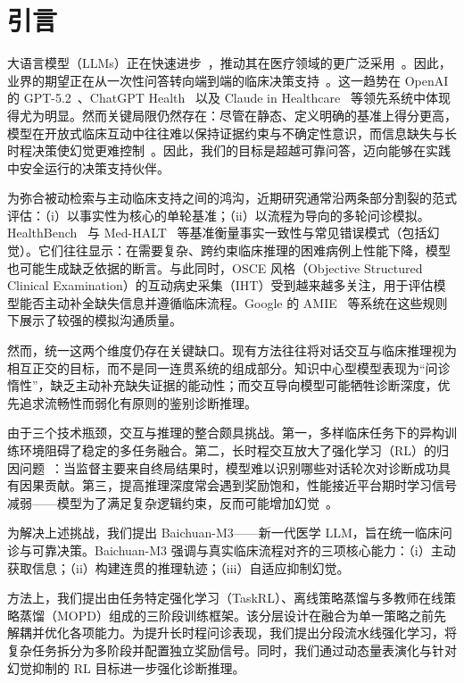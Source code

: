 \section{引言}
大语言模型（LLMs）正在快速进步~\cite{gpt4, o1, bc2,omni15}，推动其在医疗领域的更广泛采用~\cite{bcm1,baichuan-m2,MedGemma,Lingshu,Hulu-Med}。因此，业界的期望正在从一次性问答转向端到端的临床决策支持~\cite{MedDM,ArgMed}。这一趋势在 OpenAI 的 GPT-5.2~\cite{openai2025gpt52}、ChatGPT Health~\cite{chatgpt_health} 以及 Claude in Healthcare~\cite{anthropic_healthcare} 等领先系统中体现得尤为明显。然而关键局限仍然存在：尽管在静态、定义明确的基准上得分更高，模型在开放式临床互动中往往难以保持证据约束与不确定性意识，而信息缺失与长时程决策使幻觉更难控制~\cite{hallubug}。因此，我们的目标是超越可靠问答，迈向能够在实践中安全运行的决策支持伙伴。

为弥合被动检索与主动临床支持之间的鸿沟，近期研究通常沿两条部分割裂的范式评估：（i）以事实性为核心的单轮基准；（ii）以流程为导向的多轮问诊模拟。HealthBench~\cite{healthbench} 与 Med-HALT~\cite{ankit2023medhalt} 等基准衡量事实一致性与常见错误模式（包括幻觉）。它们往往显示：在需要复杂、跨约束临床推理的困难病例上性能下降，模型也可能生成缺乏依据的断言。与此同时，OSCE 风格（Objective Structured Clinical Examination）的互动病史采集（IHT）受到越来越多关注，用于评估模型能否主动补全缺失信息并遵循临床流程。Google 的 AMIE~\cite{tao2024amie, elahe2025amie} 等系统在这些规则下展示了较强的模拟沟通质量。

然而，统一这两个维度仍存在关键缺口。现有方法往往将对话交互与临床推理视为相互正交的目标，而不是同一连贯系统的组成部分。知识中心型模型表现为“问诊惰性”，缺乏主动补充缺失证据的能动性；而交互导向模型可能牺牲诊断深度，优先追求流畅性而弱化有原则的鉴别诊断推理。

由于三个技术瓶颈，交互与推理的整合颇具挑战。第一，多样临床任务下的异构训练环境阻碍了稳定的多任务融合。第二，长时程交互放大了强化学习（RL）的归因问题~\cite{guo2025deepseek,bcalign,DBLP:conf/cacre/CaoZ19}：当监督主要来自终局结果时，模型难以识别哪些对话轮次对诊断成功具有因果贡献。第三，提高推理深度常会遇到奖励饱和，性能接近平台期时学习信号减弱——模型为了满足复杂逻辑约束，反而可能增加幻觉~\cite{DBLP:journals/corr/abs-2505-23646,DBLP:journals/corr/abs-2510-22977}。

为解决上述挑战，我们提出 Baichuan-M3——新一代医学 LLM，旨在统一临床问诊与可靠决策。Baichuan-M3 强调与真实临床流程对齐的三项核心能力：（i）主动获取信息；（ii）构建连贯的推理轨迹；（iii）自适应抑制幻觉。

方法上，我们提出由任务特定强化学习（TaskRL）、离线策略蒸馏与多教师在线策略蒸馏（MOPD）组成的三阶段训练框架。该分层设计在融合为单一策略之前先解耦并优化各项能力。为提升长时程问诊表现，我们提出分段流水线强化学习，将复杂任务拆分为多阶段并配置独立奖励信号。同时，我们通过动态量表演化与针对幻觉抑制的 RL 目标进一步强化诊断推理。


